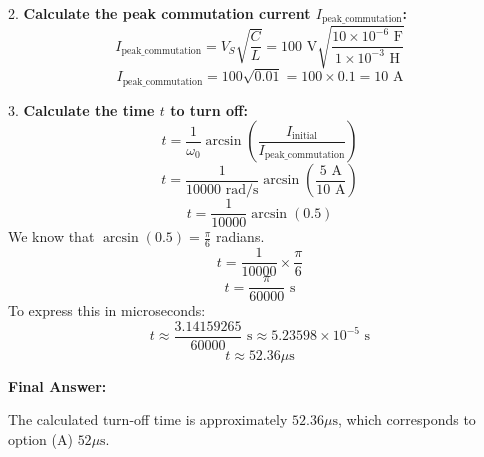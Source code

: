 \documentclass[a4paper,12pt]{article}
\begin{document}
2.  \textbf{Calculate the peak commutation current $I_{\text{peak\_commutation}}$:}
    $$I_{\text{peak\_commutation}} = V_S \sqrt{\frac{C}{L}} = 100\text{ V} \sqrt{\frac{10 \times 10^{-6}\text{ F}}{1 \times 10^{-3}\text{ H}}}$$
    $$I_{\text{peak\_commutation}} = 100 \sqrt{0.01} = 100 \times 0.1 = 10\text{ A}$$

3.  \textbf{Calculate the time $t$ to turn off:}
    $$t = \frac{1}{\omega_0} \arcsin\left(\frac{I_{\text{initial}}}{I_{\text{peak\_commutation}}}\right)$$
    $$t = \frac{1}{10000\text{ rad/s}} \arcsin\left(\frac{5\text{ A}}{10\text{ A}}\right)$$
    $$t = \frac{1}{10000} \arcsin(0.5)$$
    We know that $\arcsin(0.5) = \frac{\pi}{6}$ radians.
    $$t = \frac{1}{10000} \times \frac{\pi}{6}$$
    $$t = \frac{\pi}{60000}\text{ s}$$
    To express this in microseconds:
    $$t \approx \frac{3.14159265}{60000}\text{ s} \approx 5.23598 \times 10^{-5}\text{ s}$$
    $$t \approx 52.36\mu\text{s}$$

\textbf{Final Answer:}

The calculated turn-off time is approximately $52.36\mu\text{s}$, which corresponds to option (A) $52\mu\text{s}$.
\end{document}

